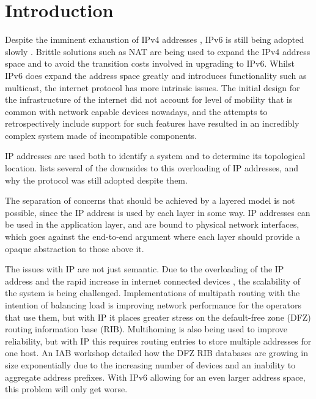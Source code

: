 \documentclass[12pt]{article}
\begin{document}
\newpage

\tableofcontents

\newpage
{}
\setcounter{page}{1} 

\section{Introduction}

Despite the imminent exhaustion of IPv4 addresses \cite{ripe_labs}, IPv6 is still being adopted slowly \cite{google_ipv6}. Brittle solutions such as NAT are being used to expand the IPv4 address space and to avoid the transition costs involved in upgrading to IPv6. Whilst IPv6 does expand the address space greatly and introduces functionality such as multicast, the internet protocol has more intrinsic issues. The initial design for the infrastructure of the internet did not account for level of mobility that is common with network capable devices nowadays, and the attempts to retrospectively include support for such features have resulted in an incredibly complex system made of incompatible components. 

IP addresses are used both to identify a system and to determine its topological location. \cite{briancarpenter2014} lists several of the downsides to this overloading of IP addresses, and why the protocol was still adopted despite them.

The separation of concerns that should be achieved by a layered model is not possible, since the IP address is used by each layer in some way. IP addresses can be used in the application layer, and are bound to physical network interfaces, which goes against the end-to-end argument where each layer should provide a opaque abstraction to those above it.

The issues with IP are not just semantic. Due to the overloading of the IP address and the rapid increase in internet connected devices \cite{iot_stat}, the scalability of the system is being challenged. Implementations of multipath routing with the intention of balancing load is improving network performance for the operators that use them, but with IP it places greater stress on the default-free zone (DFZ) routing information base (RIB). Multihoming is also being used to improve reliability, but with IP this requires routing entries to store multiple addresses for one host. An IAB workshop \cite{rfc4984} detailed how the DFZ RIB databases are growing in size exponentially due to the increasing number of devices and an inability to aggregate address prefixes. With IPv6 allowing for an even larger address space, this problem will only get worse. 
\end{document}
